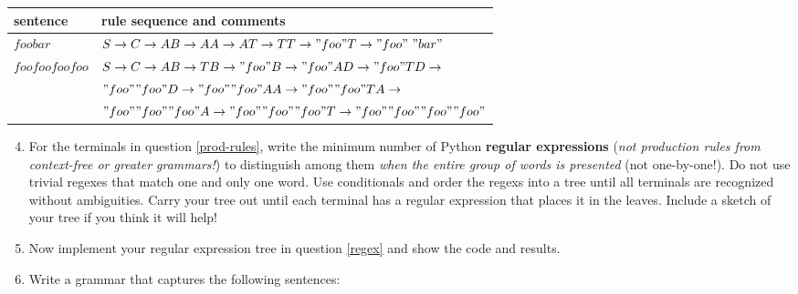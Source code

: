 \documentclass[11pt]{article}
\begin{document}
\begin{center}
\begin{tabular}{ll}
sentence & rule sequence and comments\\
\hline
\(foobar\) & \(S \rightarrow C \rightarrow AB \rightarrow AA \rightarrow AT \rightarrow TT \rightarrow "foo"T \rightarrow "foo"\ "bar"\)\\
\(foofoofoofoo\) & \(S \rightarrow C \rightarrow AB \rightarrow TB \rightarrow "foo"B \rightarrow "foo"AD \rightarrow "foo"TD \rightarrow\)\\
 & \("foo""foo"D \rightarrow "foo""foo"AA \rightarrow "foo""foo"TA \rightarrow\)\\
 & \("foo""foo""foo"A \rightarrow "foo""foo""foo"T \rightarrow "foo""foo""foo""foo"\)\\
\end{tabular}
\end{center}


\begin{enumerate}
\setcounter{enumi}{3}
\item \label{regex} For the terminals in question \ref{prod-rules}, write the
minimum number of Python \textbf{regular expressions} (\emph{not production rules
from context-free or greater grammars!}) to distinguish among them \emph{when
the entire group of words is presented} (not one-by-one!).  Do not use
trivial regexes that match one and only one word.  Use conditionals and
order the regexs into a tree until all terminals are recognized without
ambiguities.  Carry your tree out until each terminal has a regular
expression that places it in the leaves.  Include a sketch of your tree
if you think it will help!

\setcounter{enumi}{4}
\item \label{regex-imp} Now implement your regular expression tree in
question \ref{regex} and show the code and results.
\end{enumerate}



\begin{enumerate}
\setcounter{enumi}{5}
\item \label{first-gram} Write a grammar that captures the following sentences:
\end{enumerate}
\end{document}
